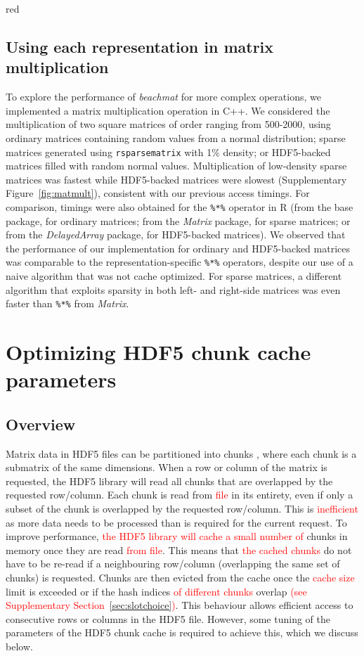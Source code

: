 \documentclass{article}
\newcommand{\beachmat}{\textit{beachmat}}
\newcommand{\code}[1]{\texttt{#1}}
\newcommand{\revised}[1]{\textcolor{red}{#1}}
\begin{document}
\begin{color}{red}
\subsection{Using each representation in matrix multiplication}
To explore the performance of \beachmat{} for more complex operations, we implemented a matrix multiplication operation in C++.
We considered the multiplication of two square matrices of order ranging from 500-2000, using ordinary matrices containing random values from a normal distribution;
sparse matrices generated using \code{rsparsematrix} with 1\% density;
or HDF5-backed matrices filled with random normal values.
Multiplication of low-density sparse matrices was fastest while HDF5-backed matrices were slowest (Supplementary Figure~\ref{fig:matmult}), consistent with our previous access timings.
For comparison, timings were also obtained for the \code{\%*\%} operator in R (from the base package, for ordinary matrices; 
from the \textit{Matrix} package, for sparse matrices;
or from the \textit{DelayedArray} package, for HDF5-backed matrices).
We observed that the performance of our implementation for ordinary and HDF5-backed matrices was comparable to the representation-specific \code{\%*\%} operators,
despite our use of a naive algorithm that was not cache optimized.
For sparse matrices, a different algorithm that exploits sparsity in both left- and right-side matrices was even faster than \code{\%*\%} from \textit{Matrix}.
\end{color}

\section{Optimizing HDF5 chunk cache parameters}
\label{sec:layoutoptim}

\subsection{Overview}
Matrix data in HDF5 files can be partitioned into chunks \cite{hdf5chunk}, where each chunk is a submatrix of the same dimensions.
When a row or column of the matrix is requested, the HDF5 library will read all chunks that are overlapped by the requested row/column.
Each chunk is read from \revised{file} in its entirety, even if only a subset of the chunk is overlapped by the requested row/column.
This is \revised{inefficient} as more data needs to be processed than is required for the current request.
To improve performance, \revised{the HDF5 library will cache a small number of} chunks in memory once they are read \revised{from file}.
This means that \revised{the cached chunks} do not have to be re-read if a neighbouring row/column (overlapping the same set of chunks) is requested.
Chunks are then evicted from the cache once the \revised{cache size} limit is exceeded or if the hash indices \revised{of different chunks} overlap \revised{(see Supplementary Section~\ref{sec:slotchoice})}.
This behaviour allows efficient access to consecutive rows or columns in the HDF5 file.
However, some tuning of the parameters of the HDF5 chunk cache is required to achieve this, which we discuss below.
\end{document}
